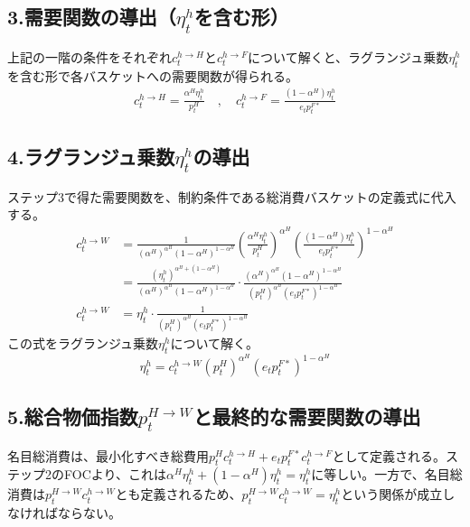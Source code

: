 \subsection*{3.需要関数の導出（\(\eta_t^h\)を含む形）}
\label{sec:appendix_cpi_derivation_sub3}
上記の一階の条件をそれぞれ\(c_t^{h\to H}\)と\(c_t^{h\to F}\)について解くと、ラグランジュ乗数\(\eta_t^h\)を含む形で各バスケットへの需要関数が得られる。
\begin{align}
c_t^{h\to H}=\frac{\alpha^H\eta_t^h}{p_t^H}\quad,\quad c_t^{h\to F}=\frac{(1-\alpha^H)\eta_t^h}{e_tp_t^{F*}}
\label{eq:appendix_cpi_derivation_sub3_demand_with_multiplier}
\end{align}

\subsection*{4.ラグランジュ乗数\(\eta_t^h\)の導出}
\label{sec:appendix_cpi_derivation_sub4}
ステップ3で得た需要関数を、制約条件である総消費バスケットの定義式に代入する。
\begin{align}
c_t^{h\to W}&=\frac{1}{(\alpha^H)^{\alpha^H}(1-\alpha^H)^{1-\alpha^H}}\left(\frac{\alpha^H\eta_t^h}{p_t^H}\right)^{\alpha^H}\left(\frac{(1-\alpha^H)\eta_t^h}{e_tp_t^{F*}\!}\right)^{1-\alpha^H} \label{eq:appendix_cpi_derivation_sub4_multiplier_step1} \\
&=\frac{(\eta_t^h)^{\alpha^H+(1-\alpha^H)}}{(\alpha^H)^{\alpha^H}(1-\alpha^H)^{1-\alpha^H}}\cdot\frac{(\alpha^H)^{\alpha^H}(1-\alpha^H)^{1-\alpha^H}}{(p_t^H)^{\alpha^H}(e_tp_t^{F*})^{1-\alpha^H}} \label{eq:appendix_cpi_derivation_sub4_multiplier_step2} \\
c_t^{h\to W}&=\eta_t^h\cdot\frac{1}{(p_t^H)^{\alpha^H}(e_tp_t^{F*})^{1-\alpha^H}} \label{eq:appendix_cpi_derivation_sub4_multiplier_step3}
\end{align}
この式をラグランジュ乗数\(\eta_t^h\)について解く。
\begin{equation}
\eta_t^h=c_t^{h\to W}(p_t^H)^{\alpha^H}(e_tp_t^{F*})^{1-\alpha^H}
\label{eq:appendix_cpi_derivation_sub4_multiplier_result}
\end{equation}

\subsection*{5.総合物価指数\(p_t^{H\to W}\)と最終的な需要関数の導出}
\label{sec:appendix_cpi_derivation_sub5}
名目総消費は、最小化すべき総費用\(p_t^Hc_t^{h\to H}+e_tp_t^{F*}c_t^{h\to F}\)として定義される。ステップ2のFOCより、これは\(\alpha^H\eta_t^h+(1-\alpha^H)\eta_t^h=\eta_t^h\)に等しい。一方で、名目総消費は\(p_t^{H\to W}c_t^{h\to W}\)とも定義されるため、\(p_t^{H\to W}c_t^{h\to W}=\eta_t^h\)という関係が成立しなければならない。

